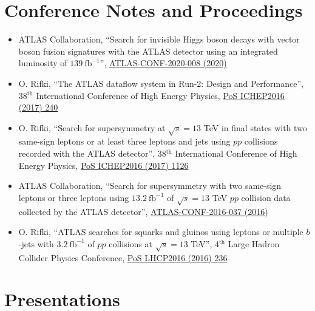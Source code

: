 \documentclass[a4paper,10pt]{article}
\begin{document}
\vspace{3mm}
\section{Conference Notes and Proceedings}

\begin{itemize}
	\item ATLAS Collaboration,
	``Search for invisible Higgs boson decays with vector boson fusion signatures with the ATLAS detector using an integrated luminosity of  $139\ \mathrm{fb}^{-1}$'',
	\href{https://atlas.web.cern.ch/Atlas/GROUPS/PHYSICS/CONFNOTES/ATLAS-CONF-2020-008/}{ATLAS-CONF-2020-008 (2020)}
	\item O. Rifki,
	``The ATLAS dataflow system in Run-2: Design and Performance'',
	38$^{\mathrm{th}}$ International Conference of High Energy Physics,
	\href{https://pos.sissa.it/282/240/pdf}{PoS ICHEP2016 (2017) 240}
	\item O. Rifki,
	``Search for supersymmetry at $\sqrt{s} = 13$ TeV in final states with two same-sign leptons or at least three leptons and jets using $pp$ collisions recorded with the ATLAS detector'',
	38$^{\mathrm{th}}$ International Conference of High Energy Physics,
	\href{https://pos.sissa.it/282/1126/pdf}{PoS ICHEP2016 (2017) 1126}
	\item ATLAS Collaboration,
	``Search for supersymmetry with two same-sign leptons or three leptons using $13.2\ \mathrm{fb}^{-1}$ of $\sqrt{s} = 13$ TeV $pp$ collision data collected by the ATLAS detector'',
	\href{https://atlas.web.cern.ch/Atlas/GROUPS/PHYSICS/CONFNOTES/ATLAS-CONF-2016-037/}{ATLAS-CONF-2016-037 (2016)}
	\item O. Rifki,
	``ATLAS searches for squarks and gluinos using leptons or multiple $b$-jets with $3.2\ \mathrm{fb}^{-1}$ of $pp$ collisions at $\sqrt{s} = 13$ TeV'',
	4$^{\mathrm{th}}$ Large Hadron Collider Physics Conference,
	\href{https://pos.sissa.it/276/236/pdf}{PoS LHCP2016 (2016) 236}
\end{itemize}

\vspace{3mm}
\section{Presentations} %
\end{document}
